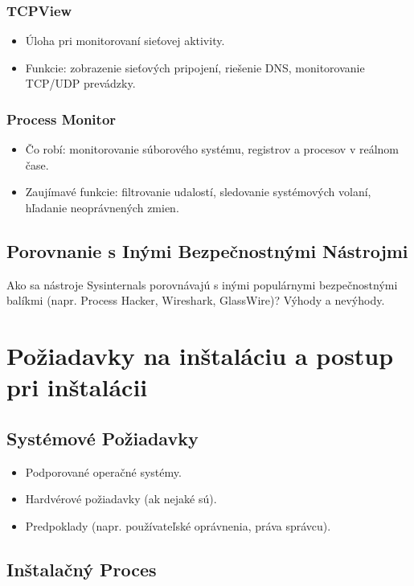 \documentclass[conference]{IEEEtran}
\begin{document}
\subsubsection{TCPView}
\begin{itemize}
    \item Úloha pri monitorovaní sieťovej aktivity.
    \item Funkcie: zobrazenie sieťových pripojení, riešenie DNS, monitorovanie TCP/UDP prevádzky.
\end{itemize}

\subsubsection{Process Monitor}
\begin{itemize}
    \item Čo robí: monitorovanie súborového systému, registrov a procesov v reálnom čase.
    \item Zaujímavé funkcie: filtrovanie udalostí, sledovanie systémových volaní, hľadanie neoprávnených zmien.
\end{itemize}

\subsection{Porovnanie s Inými Bezpečnostnými Nástrojmi}
Ako sa nástroje Sysinternals porovnávajú s inými populárnymi bezpečnostnými balíkmi (napr. Process Hacker, Wireshark, GlassWire)? Výhody a nevýhody.

\section{Požiadavky na inštaláciu a postup pri inštalácii}
\subsection{Systémové Požiadavky}
\begin{itemize}
    \item Podporované operačné systémy.
    \item Hardvérové požiadavky (ak nejaké sú).
    \item Predpoklady (napr. používateľské oprávnenia, práva správcu).
\end{itemize}

\subsection{Inštalačný Proces}
\end{document}
